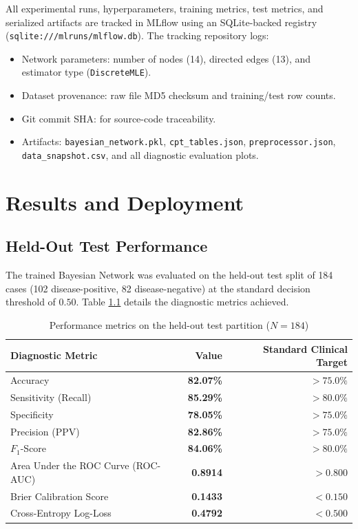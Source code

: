 \documentclass[12pt,a4paper]{report}
\begin{document}
All experimental runs, hyperparameters, training metrics, test metrics, and serialized artifacts are tracked in MLflow using an SQLite-backed registry (\texttt{sqlite:///mlruns/mlflow.db}). The tracking repository logs:
\begin{itemize}
\item Network parameters: number of nodes (14), directed edges (13), and estimator type (\texttt{DiscreteMLE}).
\item Dataset provenance: raw file MD5 checksum and training/test row counts.
\item Git commit SHA: for source-code traceability.
\item Artifacts: \texttt{bayesian\_network.pkl}, \texttt{cpt\_tables.json}, \texttt{preprocessor.json}, \texttt{data\_snapshot.csv}, and all diagnostic evaluation plots.
\end{itemize}

\chapter{Results and Deployment}

\section{Held-Out Test Performance}

The trained Bayesian Network was evaluated on the held-out test split of 184 cases (102 disease-positive, 82 disease-negative) at the standard decision threshold of $0.50$. Table \ref{tab:test_performance} details the diagnostic metrics achieved.

\begin{table}[!htbp]
\centering
\caption{Performance metrics on the held-out test partition ($N = 184$)}
\begin{tabular}{lrr}
\toprule
\textbf{Diagnostic Metric} & \textbf{Value} & \textbf{Standard Clinical Target} \\
\midrule
Accuracy & \textbf{82.07\%} & $> 75.0\%$ \\
Sensitivity (Recall) & \textbf{85.29\%} & $> 80.0\%$ \\
Specificity & \textbf{78.05\%} & $> 75.0\%$ \\
Precision (PPV) & \textbf{82.86\%} & $> 75.0\%$ \\
$F_1$-Score & \textbf{84.06\%} & $> 80.0\%$ \\
Area Under the ROC Curve (ROC-AUC) & \textbf{0.8914} & $> 0.800$ \\
Brier Calibration Score & \textbf{0.1433} & $< 0.150$ \\
Cross-Entropy Log-Loss & \textbf{0.4792} & $< 0.500$ \\
\bottomrule
\end{tabular}
\label{tab:test_performance}
\end{table}
\end{document}
